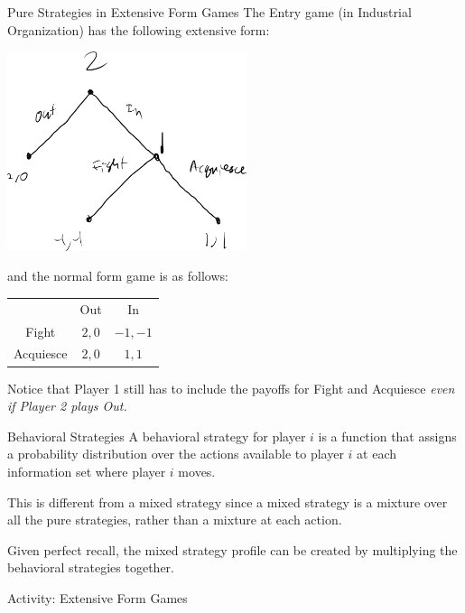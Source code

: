 \documentclass[10pt]{extarticle}
\begin{document}
\begin{problem}{Pure Strategies in Extensive Form Games}
    The Entry game (in Industrial Organization) has the following extensive form:
    \begin{center}
      \includegraphics[width=7cm]{images/entry_extensive.png}
    \end{center}
    and the normal form game is as follows:
    \begin{center}
      \renewcommand{\arraystretch}{1.5}
      \begin{tabular}{c|c|c|}
        \multicolumn{1}{c}{} & \multicolumn{1}{c}{Out} & \multicolumn{1}{c}{In}\\
        \cline{2-3}
        Fight & $2,0$ & $-1,-1$\\
        \cline{2-3}
        Acquiesce & $2,0$ & $1,1$\\
        \cline{2-3}
      \end{tabular}
    \end{center}
    Notice that Player 1 still has to include the payoffs for Fight and Acquiesce \textit{even if Player 2 plays Out.}
  \end{problem}
  \begin{problem}{Behavioral Strategies}
    A behavioral strategy for player $i$ is a function that assigns a probability distribution over the actions available to player $i$ at each information set where player $i$ moves.\newline
    
    This is different from a mixed strategy since a mixed strategy is a mixture over all the pure strategies, rather than a mixture at each action.\newline

    Given perfect recall, the mixed strategy profile can be created by multiplying the behavioral strategies together.
  \end{problem}
  \begin{problem}{Activity: Extensive Form Games}
    \begin{tcbraster}[raster columns = 1,colframe = black!75!white,colback=white]
    \end{tcbraster}
  \end{problem}
\end{document}
